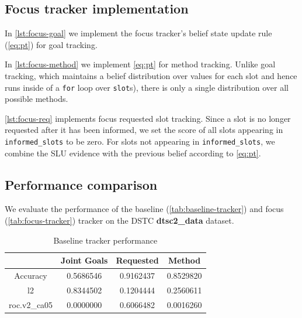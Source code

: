 \documentclass[a4paper,oneside,reqno]{amsart}
\begin{document}
\subsection{Focus tracker implementation}

In \autoref{lst:focus-goal} we implement the focus tracker's
belief state update rule (\autoref{eq:pt}) for goal tracking.



In \autoref{lst:focus-method} we implement \autoref{eq:pt} for method tracking.
Unlike goal tracking, which maintains a belief distribution over values for
each slot and hence runs inside of a \texttt{for} loop over \texttt{slot}s),
there is only a single distribution over all possible methods.



\autoref{lst:focus-req} implements focus requested slot tracking. Since a slot
is no longer requested after it has been informed, we set the score of all
slots appearing in \texttt{informed\_slots} to be zero. For slots not appearing in
\texttt{informed\_slots}, we combine the SLU evidence with the previous belief
according to \autoref{eq:pt}.



\subsection{Performance comparison}

We evaluate the performance of the baseline (\autoref{tab:baseline-tracker})
and focus (\autoref{tab:focus-tracker}) tracker on the DSTC \textbf{dtsc2\_data}
dataset.

\begin{table}[ht!]
  \begin{tabular}{cccc}
    \toprule
                  &   Joint Goals   &    Requested    &      Method    \\
    \midrule
    Accuracy      &    0.5686546    &    0.9162437    &    0.8529820   \\
    l2            &    0.8344502    &    0.1204444    &    0.2560611   \\
    roc.v2\_ca05  &    0.0000000    &    0.6066482    &    0.0016260   \\
    \bottomrule
  \end{tabular}
  \caption{Baseline tracker performance}
  \label{tab:baseline-tracker}
\end{table}
\end{document}
